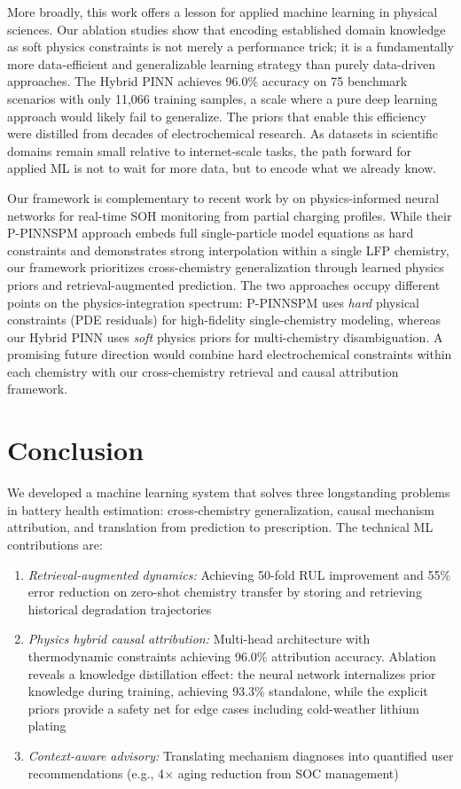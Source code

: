 \documentclass[5p,times,authoryear]{elsarticle}
\begin{document}
More broadly, this work offers a lesson for applied machine learning in physical sciences. Our ablation studies show that encoding established domain knowledge as soft physics constraints is not merely a performance trick; it is a fundamentally more data-efficient and generalizable learning strategy than purely data-driven approaches. The Hybrid PINN achieves 96.0\% accuracy on 75 benchmark scenarios with only 11,066 training samples, a scale where a pure deep learning approach would likely fail to generalize. The priors that enable this efficiency were distilled from decades of electrochemical research. As datasets in scientific domains remain small relative to internet-scale tasks, the path forward for applied ML is not to wait for more data, but to encode what we already know.

Our framework is complementary to recent work by \citet{gu2026realtime} on physics-informed neural networks for real-time SOH monitoring from partial charging profiles. While their P-PINNSPM approach embeds full single-particle model equations as hard constraints and demonstrates strong interpolation within a single LFP chemistry, our framework prioritizes cross-chemistry generalization through learned physics priors and retrieval-augmented prediction. The two approaches occupy different points on the physics-integration spectrum: P-PINNSPM uses \textit{hard} physical constraints (PDE residuals) for high-fidelity single-chemistry modeling, whereas our Hybrid PINN uses \textit{soft} physics priors for multi-chemistry disambiguation. A promising future direction would combine hard electrochemical constraints within each chemistry with our cross-chemistry retrieval and causal attribution framework.

\section{Conclusion}

We developed a machine learning system that solves three longstanding problems in battery health estimation: cross-chemistry generalization, causal mechanism attribution, and translation from prediction to prescription. The technical ML contributions are:

\begin{enumerate}[(\alph*)]
    \item \emph{Retrieval-augmented dynamics:} Achieving 50-fold RUL improvement and 55\% error reduction on zero-shot chemistry transfer by storing and retrieving historical degradation trajectories
    \item \emph{Physics hybrid causal attribution:} Multi-head architecture with thermodynamic constraints achieving 96.0\% attribution accuracy. Ablation reveals a knowledge distillation effect: the neural network internalizes prior knowledge during training, achieving 93.3\% standalone, while the explicit priors provide a safety net for edge cases including cold-weather lithium plating
    \item \emph{Context-aware advisory:} Translating mechanism diagnoses into quantified user recommendations (e.g., 4$\times$ aging reduction from SOC management)
\end{enumerate}
\end{document}
